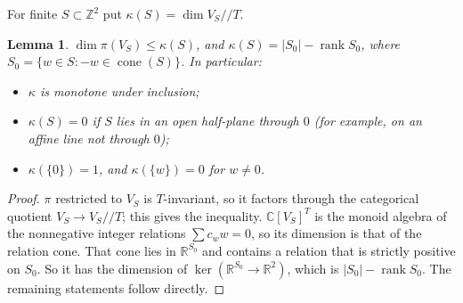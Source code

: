 \documentclass[11pt]{amsart}
\newtheorem{lemma}[theorem]{Lemma}
\theoremstyle{definition}
\theoremstyle{remark}
\newcommand{\C}{\mathbb{C}}
\newcommand{\Z}{\mathbb{Z}}
\newcommand{\R}{\mathbb{R}}
\begin{document}
For finite $S\subset\Z^2$ put $\kappa(S)=\dim V_S/\!/T$.

\begin{lemma}\label{lem:kappa}
$\dim\pi(V_S)\le\kappa(S)$, and $\kappa(S)=|S_0|-\operatorname{rank}S_0$, where $S_0=\{w\in S:-w\in\operatorname{cone}(S)\}$. In particular:
\begin{itemize}
\item $\kappa$ is monotone under inclusion;
\item $\kappa(S)=0$ if $S$ lies in an open half-plane through $0$ (for example, on an affine line not through $0$);
\item $\kappa(\{0\})=1$, and $\kappa(\{w\})=0$ for $w\neq0$.
\end{itemize}
\end{lemma}
\begin{proof}
$\pi$ restricted to $V_S$ is $T$-invariant, so it factors through the categorical quotient $V_S\to V_S/\!/T$; this gives the inequality. $\C[V_S]^T$ is the monoid algebra of the nonnegative integer relations $\sum c_ww=0$, so its dimension is that of the relation cone. That cone lies in $\R^{S_0}$ and contains a relation that is strictly positive on $S_0$. So it has the dimension of $\ker(\R^{S_0}\to\R^2)$, which is $|S_0|-\operatorname{rank}S_0$. The remaining statements follow directly.
\end{proof}
\end{document}
